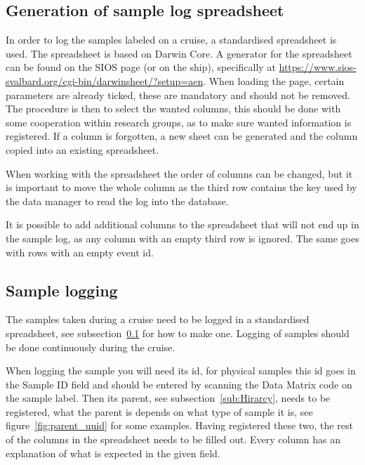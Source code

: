 \documentclass[a4paper,english, 11pt]{article}
\begin{document}


\subsection{Generation of sample log spreadsheet} %
\label{sub:Sample_log_spreadsheet_generation}

In order to log the samples labeled on a cruise, a standardised spreadsheet is used. The spreadsheet is based on Darwin Core. A generator for the spreadsheet can be found on the SIOS page (or on the ship), specifically at \url{https://www.sios-svalbard.org/cgi-bin/darwinsheet/?setup=aen}. When loading the page, certain parameters are already ticked, these are mandatory and should not be removed. 
The procedure is then to select the wanted columns, this should be done with some cooperation within research groups, as to make sure wanted information is registered. If a column is forgotten, a new sheet can be generated and the column copied into an existing spreadsheet.

When working with the spreadsheet the order of columns can be changed, but it is important to move the whole column as the third row contains the key used by the data manager to read the log into the database. 

It is possible to add additional columns to the spreadsheet that will not end up in the sample log, as any column with an empty third row is ignored. The same goes with rows with an empty event id. 



\subsection{Sample logging} %
\label{sub:spreadsheet_reg}


The samples taken during a cruise need to be logged in a standardised spreadsheet, see subsection~\ref{sub:Sample_log_spreadsheet_generation} for how to make one. Logging of samples should be done continuously during the cruise. 

When logging the sample you will need its id, for physical samples this id goes in the Sample ID field and should be entered by scanning the Data Matrix code on the sample label. Then its parent, see subsection~\ref{sub:Hirarcy}, needs to be registered, what the parent is depends on what type of sample it is, see figure~\ref{fig:parent_uuid} for some examples. Having registered these two, the rest of the columns in the spreadsheet needs to be filled out. Every column has an explanation of what is expected in the given field. 
\end{document}
